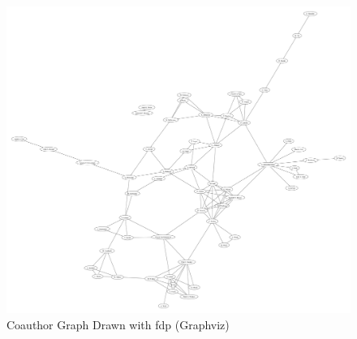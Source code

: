 \documentclass[a4paper]{article}
\begin{document}
\clearpage
\begin{figure}[htbp]
\caption{Coauthor Graph Drawn with fdp (Graphviz)}
\centering
\includegraphics[width=.6\textwidth]{../graphviz/fdp.pdf}

\end{figure}
\end{document}

